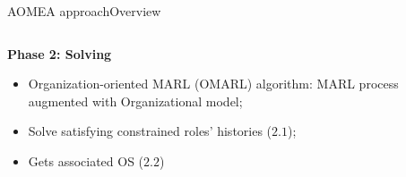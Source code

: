 \begin{frame}{AOMEA approach}{Overview}

    \begin{columns}

        \begin{column}{0.6\textwidth}

            \textbf{Phase 2: Solving}

            \begin{itemize}
                \item Organization-oriented MARL (OMARL) algorithm: MARL process augmented with Organizational model;
                \item Solve satisfying constrained roles' histories ($2.1$);
                \item Gets associated OS ($2.2$)
            \end{itemize}

        \end{column}

        \begin{column}{0.4\textwidth}
            \centering
        \end{column}


\end{columns}
\end{frame}
